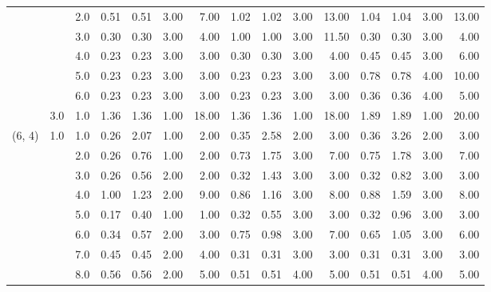 \begin{tabular}{lllrrrrrrrrrrrr}
       &     & 2.0  &       0.51 &      0.51 & 3.00 &   7.00 &       1.02 &      1.02 &  3.00 &  13.00 &       1.04 &      1.04 &  3.00 &  13.00 \\
       &     & 3.0  &       0.30 &      0.30 & 3.00 &   4.00 &       1.00 &      1.00 &  3.00 &  11.50 &       0.30 &      0.30 &  3.00 &   4.00 \\
       &     & 4.0  &       0.23 &      0.23 & 3.00 &   3.00 &       0.30 &      0.30 &  3.00 &   4.00 &       0.45 &      0.45 &  3.00 &   6.00 \\
       &     & 5.0  &       0.23 &      0.23 & 3.00 &   3.00 &       0.23 &      0.23 &  3.00 &   3.00 &       0.78 &      0.78 &  4.00 &  10.00 \\
       &     & 6.0  &       0.23 &      0.23 & 3.00 &   3.00 &       0.23 &      0.23 &  3.00 &   3.00 &       0.36 &      0.36 &  4.00 &   5.00 \\
       & 3.0 & 1.0  &       1.36 &      1.36 & 1.00 &  18.00 &       1.36 &      1.36 &  1.00 &  18.00 &       1.89 &      1.89 &  1.00 &  20.00 \\
(6, 4) & 1.0 & 1.0  &       0.26 &      2.07 & 1.00 &   2.00 &       0.35 &      2.58 &  2.00 &   3.00 &       0.36 &      3.26 &  2.00 &   3.00 \\
       &     & 2.0  &       0.26 &      0.76 & 1.00 &   2.00 &       0.73 &      1.75 &  3.00 &   7.00 &       0.75 &      1.78 &  3.00 &   7.00 \\
       &     & 3.0  &       0.26 &      0.56 & 2.00 &   2.00 &       0.32 &      1.43 &  3.00 &   3.00 &       0.32 &      0.82 &  3.00 &   3.00 \\
       &     & 4.0  &       1.00 &      1.23 & 2.00 &   9.00 &       0.86 &      1.16 &  3.00 &   8.00 &       0.88 &      1.59 &  3.00 &   8.00 \\
       &     & 5.0  &       0.17 &      0.40 & 1.00 &   1.00 &       0.32 &      0.55 &  3.00 &   3.00 &       0.32 &      0.96 &  3.00 &   3.00 \\
       &     & 6.0  &       0.34 &      0.57 & 2.00 &   3.00 &       0.75 &      0.98 &  3.00 &   7.00 &       0.65 &      1.05 &  3.00 &   6.00 \\
       &     & 7.0  &       0.45 &      0.45 & 2.00 &   4.00 &       0.31 &      0.31 &  3.00 &   3.00 &       0.31 &      0.31 &  3.00 &   3.00 \\
       &     & 8.0  &       0.56 &      0.56 & 2.00 &   5.00 &       0.51 &      0.51 &  4.00 &   5.00 &       0.51 &      0.51 &  4.00 &   5.00 \\

\end{tabular}
